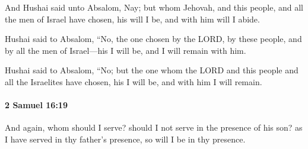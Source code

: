 			\begin{versebox}
					\item[BHS] 
					\item[ASV] And Hushai said unto Absalom, Nay; but whom Jehovah, and this people, and all the men of Israel have chosen, his will I be, and with him will I abide.
					\item[NIV] Hushai said to Absalom, “No, the one chosen by the LORD, by these people, and by all the men of Israel—his I will be, and I will remain with him.
					\item[NRSV] Hushai said to Absalom, “No; but the one whom the LORD and this people and all the Israelites have chosen, his I will be, and with him I will remain.
			\end{versebox}

		\paragraph{2 Samuel 16:19} %
			\label{2SAMUEL-16-19}

			And again, whom should I serve? should I not serve in the presence of his son? as I have served in thy father’s presence, so will I be in thy presence.

